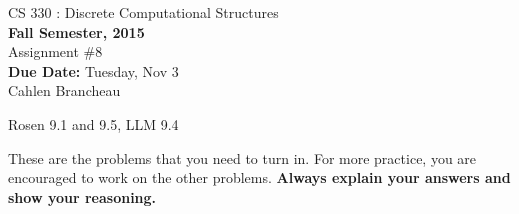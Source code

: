 \documentclass[11pt]{article}
\begin{document}
\begin{center}
{{\large CS 330 : Discrete Computational Structures}}\\


{\bf Fall Semester, 2015}\\

{\sc Assignment \#8}\\
{\bf Due Date:}  Tuesday, Nov 3\\
Cahlen Brancheau
\end{center}

 Rosen 9.1 and 9.5, LLM 9.4

These are the problems that you need to turn in. For more
practice, you are encouraged to work on the other problems. {\bf Always
explain your answers and show your reasoning.}

\end{document}
